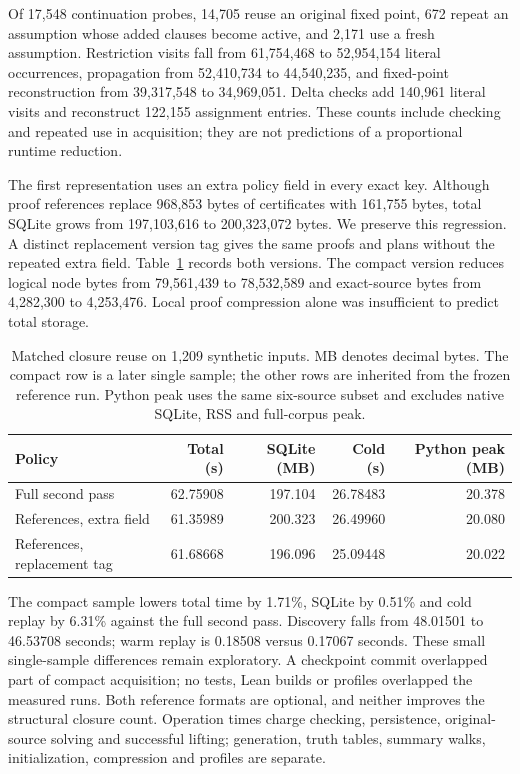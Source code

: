 \documentclass[11pt,a4paper]{article}
\numberwithin{equation}{section}
\theoremstyle{plain}
\theoremstyle{definition}
\theoremstyle{remark}
\begin{document}
Of 17,548 continuation probes, 14,705 reuse an original fixed point, 672 repeat an assumption whose added clauses become active, and 2,171 use a fresh assumption. Restriction visits fall from 61,754,468 to 52,954,154 literal occurrences, propagation from 52,410,734 to 44,540,235, and fixed-point reconstruction from 39,317,548 to 34,969,051. Delta checks add 140,961 literal visits and reconstruct 122,155 assignment entries. These counts include checking and repeated use in acquisition; they are not predictions of a proportional runtime reduction.

The first representation uses an extra policy field in every exact key. Although proof references replace 968,853 bytes of certificates with 161,755 bytes, total SQLite grows from 197,103,616 to 200,323,072 bytes. We preserve this regression. A distinct replacement version tag gives the same proofs and plans without the repeated extra field. Table~\ref{tab:probe-closure-reuse} records both versions. The compact version reduces logical node bytes from 79,561,439 to 78,532,589 and exact-source bytes from 4,282,300 to 4,253,476. Local proof compression alone was insufficient to predict total storage.

\begin{table}[htbp]
\centering
\small
\begin{tabular}{lrrrr}
\hline
Policy & Total (s) & SQLite (MB) & Cold (s) & Python peak (MB) \\
\hline
Full second pass & 62.75908 & 197.104 & 26.78483 & 20.378 \\
References, extra field & 61.35989 & 200.323 & 26.49960 & 20.080 \\
References, replacement tag & 61.68668 & 196.096 & 25.09448 & 20.022 \\
\hline
\end{tabular}
\caption{Matched closure reuse on 1,209 synthetic inputs. MB denotes decimal bytes. The compact row is a later single sample; the other rows are inherited from the frozen reference run. Python peak uses the same six-source subset and excludes native SQLite, RSS and full-corpus peak.}
\label{tab:probe-closure-reuse}
\end{table}

The compact sample lowers total time by 1.71\%, SQLite by 0.51\% and cold replay by 6.31\% against the full second pass. Discovery falls from 48.01501 to 46.53708 seconds; warm replay is 0.18508 versus 0.17067 seconds. These small single-sample differences remain exploratory. A checkpoint commit overlapped part of compact acquisition; no tests, Lean builds or profiles overlapped the measured runs. Both reference formats are optional, and neither improves the structural closure count. Operation times charge checking, persistence, original-source solving and successful lifting; generation, truth tables, summary walks, initialization, compression and profiles are separate.
\end{document}
